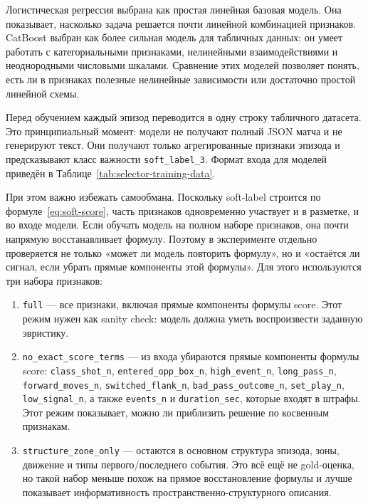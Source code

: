 \documentclass[a4paper,14pt]{extarticle}
\numberwithin{table}{section}
\numberwithin{figure}{section}
\numberwithin{equation}{section}
\begin{document}
Логистическая регрессия выбрана как простая линейная базовая модель. Она показывает, насколько задача решается почти линейной комбинацией признаков. CatBoost выбран как более сильная модель для табличных данных: он умеет работать с категориальными признаками, нелинейными взаимодействиями и неоднородными числовыми шкалами. Сравнение этих моделей позволяет понять, есть ли в признаках полезные нелинейные зависимости или достаточно простой линейной схемы.

Перед обучением каждый эпизод переводится в одну строку табличного датасета. Это принципиальный момент: модели не получают полный JSON матча и не генерируют текст. Они получают только агрегированные признаки эпизода и предсказывают класс важности \texttt{soft\_label\_3}. Формат входа для моделей приведён в Таблице~\ref{tab:selector-training-data}.



При этом важно избежать самообмана. Поскольку soft-label строится по формуле~\eqref{eq:soft-score}, часть признаков одновременно участвует и в разметке, и во входе модели. Если обучать модель на полном наборе признаков, она почти напрямую восстанавливает формулу. Поэтому в эксперименте отдельно проверяется не только «может ли модель повторить формулу», но и «остаётся ли сигнал, если убрать прямые компоненты этой формулы». Для этого используются три набора признаков:

\begin{enumerate}
    \item \texttt{full} --- все признаки, включая прямые компоненты формулы score. Этот режим нужен как sanity check: модель должна уметь воспроизвести заданную эвристику.
    \item \texttt{no\_exact\_score\_terms} --- из входа убираются прямые компоненты формулы score: \texttt{class\_shot\_n}, \texttt{entered\_opp\_box\_n}, \texttt{high\_event\_n}, \texttt{long\_pass\_n}, \texttt{forward\_moves\_n}, \texttt{switched\_flank\_n}, \texttt{bad\_pass\_outcome\_n}, \texttt{set\_play\_n}, \texttt{low\_signal\_n}, а также \texttt{events\_n} и \texttt{duration\_sec}, которые входят в штрафы. Этот режим показывает, можно ли приблизить решение по косвенным признакам.
    \item \texttt{structure\_zone\_only} --- остаются в основном структура эпизода, зоны, движение и типы первого/последнего события. Это всё ещё не gold-оценка, но такой набор меньше похож на прямое восстановление формулы и лучше показывает информативность пространственно-структурного описания.
\end{enumerate}
\end{document}
